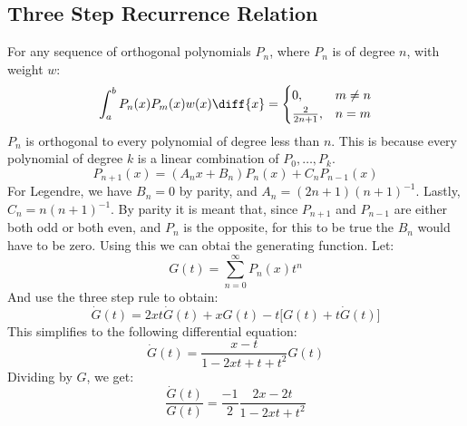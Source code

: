 \documentclass[crop=false,class=book,oneside]{standalone}
\begin{document}
        \subsection{Three Step Recurrence Relation}
            For any sequence of orthogonal polynomials $P_{n}$,
            where $P_{n}$ is of degree $n$, with weight $w$:
            \begin{equation}
                \int_{a}^{b}P_{n}(x)P_{m}(x)w(x)\diff{x}=
                \begin{cases}
                    0,&m\ne{n}\\
                    \frac{2}{2n+1},&n=m
                \end{cases}
            \end{equation}
            $P_{n}$ is orthogonal to every polynomial of
            degree less than $n$. This is because every
            polynomial of degree $k$ is a linear combination
            of $P_{0},\dots,P_{k}$.
            \begin{equation}
                P_{n+1}(x)=(A_{n}x+B_{n})P_{n}(x)+
                    C_{n}P_{n-1}(x)
            \end{equation}
            For Legendre, we have $B_{n}=0$ by parity, and
            $A_{n}=(2n+1)(n+1)^{\minus{1}}$. Lastly,
            $C_{n}=n(n+1)^{\minus{1}}$. By parity it is meant
            that, since $P_{n+1}$ and $P_{n-1}$ are either both
            odd or both even, and $P_{n}$ is the opposite, for
            this to be true the $B_{n}$ would have to be zero.
            Using this we can obtai the generating function. Let:
            \begin{equation}
                G(t)=\sum_{n=0}^{\infty}P_{n}(x)t^{n}
            \end{equation}
            And use the three step rule to obtain:
            \begin{equation}
                \dot{G}(t)=2xt\dot{G}(t)+xG(t)-t\big[
                    G(t)+t\dot{G}(t)\big]
            \end{equation}
            This simplifies to the following differential
            equation:
            \begin{equation}
                \dot{G}(t)=\frac{x-t}{1-2xt+t+t^{2}}G(t)
            \end{equation}
            Dividing by $G$, we get:
            \begin{equation}
                \frac{\dot{G}(t)}{G(t)}=
                \frac{\minus{1}}{2}\frac{2x-2t}{1-2xt+t^{2}}
            \end{equation}
\end{document}

